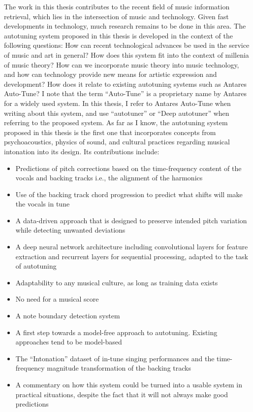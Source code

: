 The work in this thesis contributes to the recent field of music information retrieval, which lies in the intersection of music and technology. Given fast developments in technology, much research remains to be done in this area. The autotuning system proposed in this thesis is developed in the context of the following questions: How can recent technological advances be used in the service of music and art in general? How does this system fit into the context of millenia of music theory? How can we incorporate music theory into music technology, and how can technology provide new means for artistic expression and development? How does it relate to existing autotuning systems such as Antares Auto-Tune? I note that the term ``Auto-Tune'' is a proprietary name by Antares for a widely used system. In this thesis, I refer to Antares Auto-Tune when writing about this system, and use ``autotuner'' or ``Deep autotuner'' when referring to the proposed system. 
As far as I know, the autotuning system proposed in this thesis is the first one that incorporates concepts from psychoacoustics, physics of sound, and cultural practices regarding musical intonation into its design. Its contributions include:
\begin{itemize}
    \item Predictions of pitch corrections based on the time-frequency content of the vocals and backing tracks i.e., the alignment of the harmonics
    \item Use of the backing track chord progression to predict what shifts will make the vocals in tune
    \item A data-driven approach that is designed to preserve intended pitch variation while detecting unwanted deviations
    \item A deep neural network architecture including convolutional layers for feature extraction and recurrent layers for sequential processing, adapted to the task of autotuning
    \item Adaptability to any musical culture, as long as training data exists
    \item No need for a musical score
    \item A note boundary detection system
    \item A first step towards a model-free approach to autotuning. Existing approaches tend to be model-based
    \item The ``Intonation'' dataset of in-tune singing performances and the time-frequency magnitude transformation of the backing tracks
    \item A commentary on how this system could be turned into a usable system in practical situations, despite the fact that it will not always make good predictions
\end{itemize}

